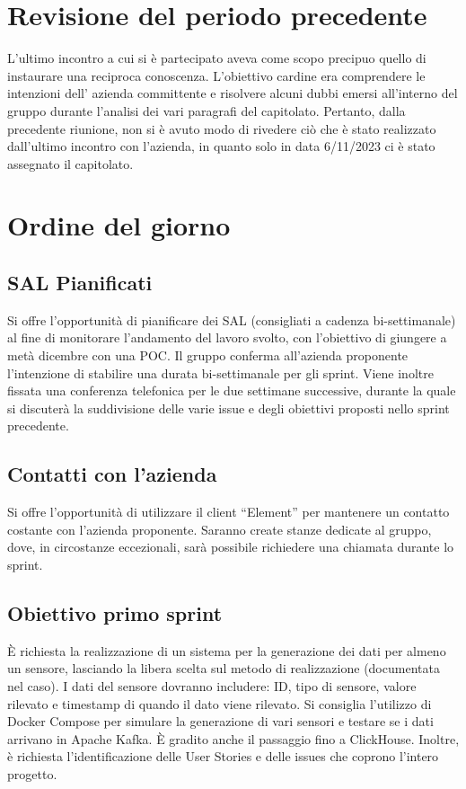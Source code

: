 \documentclass{article}
\begin{document}
\section{Revisione del periodo precedente}
L’ultimo incontro a cui si è partecipato aveva come scopo precipuo quello di instaurare una reciproca conoscenza. L’obiettivo cardine era comprendere le intenzioni dell' azienda committente e risolvere alcuni dubbi emersi all’interno del gruppo durante l’analisi dei vari paragrafi del capitolato.
Pertanto, dalla precedente riunione, non si è avuto modo di rivedere ciò che è stato realizzato dall’ultimo incontro con l’azienda, in quanto solo in data 6/11/2023 ci è stato assegnato il capitolato.
\section{Ordine del giorno} 
\subsection{SAL Pianificati} 
Si offre l’opportunità di pianificare dei SAL (consigliati a cadenza bi-settimanale) al fine di monitorare l’andamento del lavoro svolto, con l’obiettivo di giungere a metà dicembre con una POC. Il gruppo conferma all’azienda proponente l’intenzione 
di stabilire una durata bi-settimanale per gli sprint. Viene inoltre fissata una conferenza telefonica per le due settimane successive, durante la quale si discuterà la suddivisione delle varie issue e degli obiettivi proposti nello sprint precedente.

\subsection{Contatti con l'azienda} 
Si offre l’opportunità di utilizzare il client “Element” per mantenere un contatto costante con l’azienda proponente. Saranno create stanze dedicate al gruppo, dove, in circostanze eccezionali, sarà possibile richiedere una chiamata durante lo sprint.

\subsection{Obiettivo primo sprint}
È richiesta la realizzazione di un sistema per la generazione dei dati per almeno un sensore, lasciando la libera scelta sul metodo di realizzazione (documentata nel caso). I dati del sensore dovranno includere: ID, tipo di sensore, valore rilevato e timestamp di quando il dato viene rilevato.
Si consiglia l'utilizzo di Docker Compose per simulare la generazione di vari sensori e testare se i dati arrivano in Apache Kafka. È gradito anche il passaggio fino a ClickHouse.
Inoltre, è richiesta l'identificazione delle User Stories e delle issues che coprono l'intero progetto.
\end{document}
